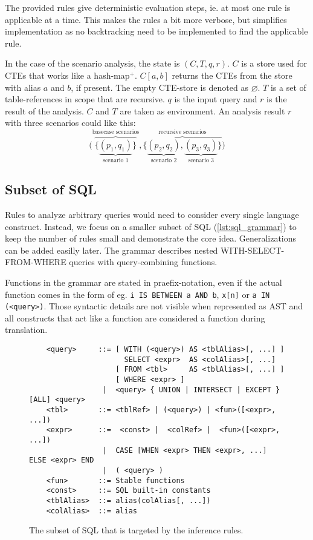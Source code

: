 The provided rules give deterministic evaluation steps, ie. at most one rule is applicable at a time. This makes the rules a bit more verbose, but simplifies implementation as no backtracking need to be implemented to find the applicable rule.

In the case of the scenario analysis, the state is $(C, T, q, r)$. $C$ is a store used for CTEs that works like a hash-map${}^+$. $C[a, b]$ returns the CTEs from the store with alias $a$ and $b$, if present. The empty CTE-store is denoted as $\varnothing$. $T$ is a set of table-references in scope that are recursive. $q$ is the input query and $r$ is the result of the analysis. $C$ and $T$ are taken as environment. An analysis result $r$ with three scenarios could like this:
$$
\Big(
    \overbrace{\big\{
        \underbrace{
            (p_1, q_1)
        }_{\text{scenario 1}}
    \big\}}^{\text{basecase scenarios}}
    ,
    \overbrace{\big\{
        \underbrace{
            (p_2, q_2)
        }_{\text{scenario 2}},
        \underbrace{
            (p_3, q_3)
        }_{\text{scenario 3}}
    \big\}}^{\text{recursive scenarios}}
\Big)
$$

\subsection{Subset of SQL}
Rules to analyze arbitrary queries would need to consider every single language construct. Instead, we focus on a smaller subset of SQL (\autoref{lst:sql_grammar}) to keep the number of rules small and demonstrate the core idea. Generalizations can be added easilly later. The grammar describes nested WITH-SELECT-FROM-WHERE queries with query-combining functions.

Functions in the grammar are stated in praefix-notation, even if the actual function comes in the form of eg. \texttt{i IS BETWEEN a AND b}, \texttt{x[n]} or \texttt{a IN (<query>)}. Those syntactic details are not visible when represented as AST and all constructs that act like a function are considered a function during translation.

\begin{figure}[H]
    \begin{verbatim}
    <query>     ::= [ WITH (<query>) AS <tblAlias>[, ...] ]
                      SELECT <expr>  AS <colAlias>[, ...]
                    [ FROM <tbl>     AS <tblAlias>[, ...] ]
                    [ WHERE <expr> ]
                 |  <query> { UNION | INTERSECT | EXCEPT } [ALL] <query>
    <tbl>       ::= <tblRef> | (<query>) | <fun>([<expr>, ...])
    <expr>      ::=  <const> |  <colRef> |  <fun>([<expr>, ...])
                 |  CASE [WHEN <expr> THEN <expr>, ...] ELSE <expr> END
                 |  ( <query> )
    <fun>       ::= Stable functions
    <const>     ::= SQL built-in constants
    <tblAlias>  ::= alias(colAlias[, ...])
    <colAlias>  ::= alias
    \end{verbatim}
    \caption{The subset of SQL that is targeted by the inference rules.}
    \label{lst:sql_grammar}
\end{figure}



